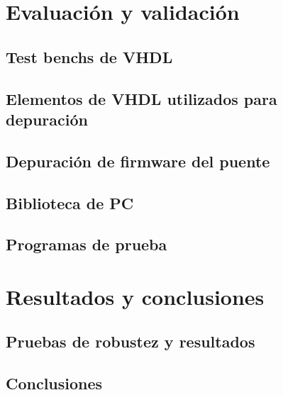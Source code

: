 \documentclass[11pt,a4paper]{beamer}
\begin{document}
	\section{Evaluación y validación}
		\subsection{Test benchs de VHDL}
			
		\subsection{Elementos de VHDL utilizados para depuración}
			
		\subsection{Depuración de firmware del puente}
			
		\subsection{Biblioteca de PC}
			
		\subsection{Programas de prueba}
			
	\section{Resultados y conclusiones}
		\subsection{Pruebas de robustez y resultados}
			
		\subsection{Conclusiones}
			
\end{document}
